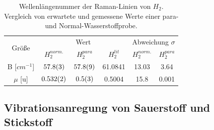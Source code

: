 \documentclass[11 pt]{article}
\begin{document}
\begin{table}[!htbp]
 \begin{center}
  \caption{\small Wellenlängenummer der Raman-Linien von $H_2$. Vergleich von erwartete und gemessene Werte einer para- und Normal-Wasserstoffprobe.}
  \label{tab:H2_B_mu}
  \renewcommand{\arraystretch}{1.3} %
  \begin{tabular}{|c|c|c|c|c|c|}
  \hline

\multirow{2}{*}{Größe}&\multicolumn{3}{c|}{Wert}& \multicolumn{2}{c|}{ Abweichung $\sigma$} \\ \cline{2-6} %
 					 &$H_2^{norm.}$	&	$H_2^{para}$ &  $H_2^{lit}$ &  $H_2^{norm.}$	&	$H_2^{para}$\\ 
  \hline
	\hline 
B [$\unit{cm^{-1}}$] & $\num{57.8\pm0.3}$ & $\num{57.8\pm0.9}$ & 61.0841 & 13.03 & 3.64 \\
$\mu$ [$\unit{\atomicmassunit}$] & $\num{0.532\pm0.002}$& $\num{0.5\pm0.3}$&0.5004 &15.8 & 0.001\\
	\hline
  \end{tabular}
  \renewcommand{\arraystretch}{1}
 \end{center}
\end{table}




\subsection{Vibrationsanregung von Sauerstoff und Stickstoff}
\end{document}
